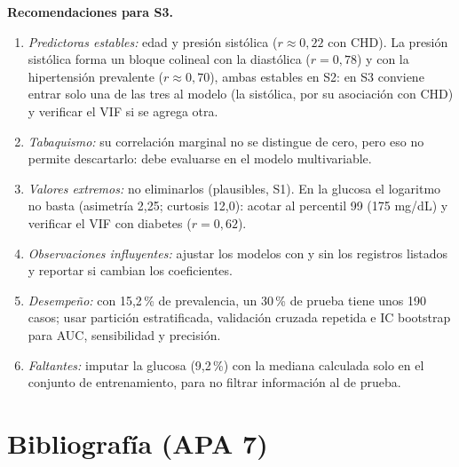 \documentclass[11pt,a4paper]{article}
\begin{document}
\textbf{Recomendaciones para S3.}
\begin{enumerate}[leftmargin=1.4em,itemsep=0pt,parsep=0pt,topsep=0.1em]
\item \emph{Predictoras estables:} edad y presión sistólica ($r\approx0{,}22$ con CHD). La presión sistólica forma un bloque colineal con la diastólica ($r=0{,}78$) y con la hipertensión prevalente ($r\approx0{,}70$), ambas estables en S2: en S3 conviene entrar solo una de las tres al modelo (la sistólica, por su asociación con CHD) y verificar el VIF si se agrega otra.
\item \emph{Tabaquismo:} su correlación marginal no se distingue de cero, pero eso no permite descartarlo: debe evaluarse en el modelo multivariable.
\item \emph{Valores extremos:} no eliminarlos (plausibles, S1). En la glucosa el logaritmo no basta (asimetría 2,25; curtosis 12,0): acotar al percentil 99 (175 mg/dL) y verificar el VIF con diabetes ($r=0{,}62$).
\item \emph{Observaciones influyentes:} ajustar los modelos con y sin los registros listados y reportar si cambian los coeficientes.
\item \emph{Desempeño:} con 15,2\,\% de prevalencia, un 30\,\% de prueba tiene unos 190 casos; usar partición estratificada, validación cruzada repetida e IC bootstrap para AUC, sensibilidad y precisión.
\item \emph{Faltantes:} imputar la glucosa (9,2\,\%) con la mediana calculada solo en el conjunto de entrenamiento, para no filtrar información al de prueba.
\end{enumerate}

\clearpage
\section{Bibliografía (APA 7)}
\end{document}
